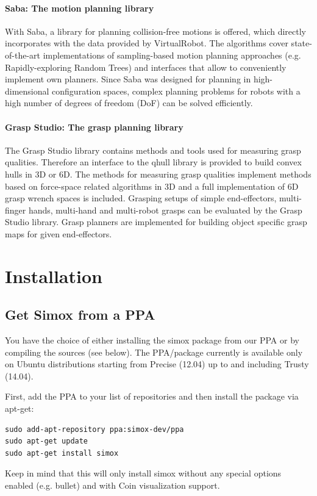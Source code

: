 \subsubsection{Saba: The motion planning library}
With Saba, a library for planning collision-free motions is offered, which directly incorporates with the data provided by VirtualRobot. The algorithms cover state-of-the-art implementations of sampling-based motion planning approaches (e.g. Rapidly-exploring Random Trees) and interfaces that allow to conveniently implement own planners. Since Saba was designed for planning in high-dimensional configuration spaces, complex planning problems for robots with a high number of degrees of freedom (DoF) can be solved efficiently. 
\subsubsection{Grasp Studio: The grasp planning library}
The Grasp Studio library contains methods and tools used for measuring grasp qualities. Therefore an interface to the qhull library is provided to build convex hulls in 3D or 6D. The methods for measuring grasp qualities implement methods based on force-space related algorithms in 3D and a full implementation of 6D grasp wrench spaces is included. Grasping setups of simple end-effectors, multi-finger hands, multi-hand and multi-robot grasps can be evaluated by the Grasp Studio library. Grasp planners are implemented for building object specific grasp maps for given end-effectors. 
\chapter{Installation}
\section{Get Simox from a PPA}
You have the choice of either installing the simox package from our PPA or by compiling the sources (see below). The PPA/package currently is available only on Ubuntu distributions starting from Precise (12.04) up to and including Trusty (14.04).
\par
First, add the PPA to your list of repositories and then install the package via apt-get: 
\begin{lstlisting}
sudo add-apt-repository ppa:simox-dev/ppa
sudo apt-get update
sudo apt-get install simox
\end{lstlisting}
Keep in mind that this will only install simox without any special options enabled (e.g. bullet) and with Coin visualization support. 
